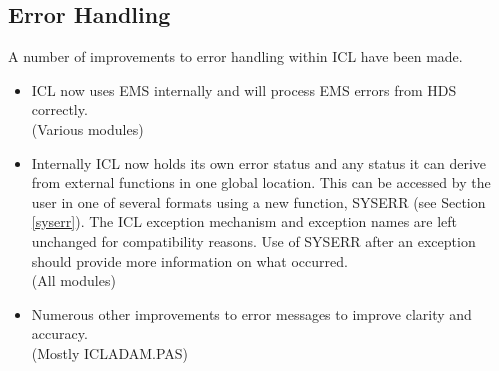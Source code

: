 \subsection{Error Handling} 
\label{errs}
A number of improvements to error handling within ICL have been made.
\begin{itemize}
\item ICL now uses EMS internally and will process EMS 
errors from HDS correctly.\\
(Various modules)
\item Internally ICL now holds its own error status and any status it can 
derive from external functions in one global location. 
This can be accessed by the user in
one of several formats using a new function, SYSERR (see 
Section \ref{syserr}). The ICL exception
mechanism and exception names are left unchanged for compatibility reasons. 
Use
of SYSERR after an exception should provide more information on what 
occurred.\\
(All modules)
\item Numerous other improvements to error messages to improve clarity and
accuracy.\\
(Mostly ICLADAM.PAS)
\end{itemize}

